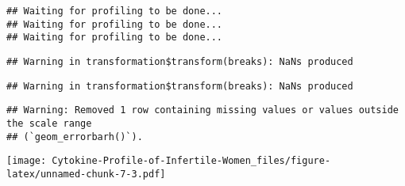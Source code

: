 \documentclass[
]{article}
\begin{document}
\begin{verbatim}
## Waiting for profiling to be done...
## Waiting for profiling to be done...
## Waiting for profiling to be done...
\end{verbatim}

\begin{verbatim}
## Warning in transformation$transform(breaks): NaNs produced
\end{verbatim}

\begin{verbatim}
## Warning in transformation$transform(breaks): NaNs produced
\end{verbatim}

\begin{verbatim}
## Warning: Removed 1 row containing missing values or values outside the scale range
## (`geom_errorbarh()`).
\end{verbatim}

\texttt{[image: Cytokine-Profile-of-Infertile-Women\_files/figure-latex/unnamed-chunk-7-3.pdf]}
\end{document}
